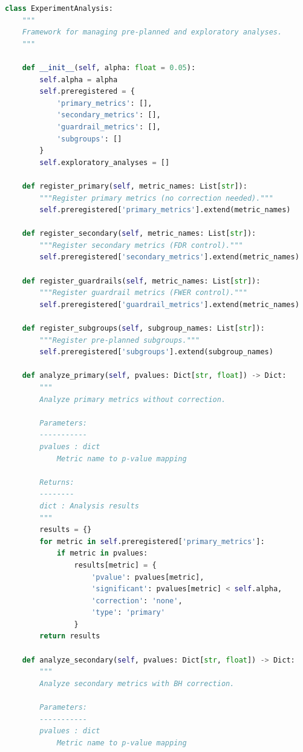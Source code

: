 \begin{lstlisting}[language=Python, caption={Pre-Planned vs Exploratory Framework}]
class ExperimentAnalysis:
    """
    Framework for managing pre-planned and exploratory analyses.
    """

    def __init__(self, alpha: float = 0.05):
        self.alpha = alpha
        self.preregistered = {
            'primary_metrics': [],
            'secondary_metrics': [],
            'guardrail_metrics': [],
            'subgroups': []
        }
        self.exploratory_analyses = []

    def register_primary(self, metric_names: List[str]):
        """Register primary metrics (no correction needed)."""
        self.preregistered['primary_metrics'].extend(metric_names)

    def register_secondary(self, metric_names: List[str]):
        """Register secondary metrics (FDR control)."""
        self.preregistered['secondary_metrics'].extend(metric_names)

    def register_guardrails(self, metric_names: List[str]):
        """Register guardrail metrics (FWER control)."""
        self.preregistered['guardrail_metrics'].extend(metric_names)

    def register_subgroups(self, subgroup_names: List[str]):
        """Register pre-planned subgroups."""
        self.preregistered['subgroups'].extend(subgroup_names)

    def analyze_primary(self, pvalues: Dict[str, float]) -> Dict:
        """
        Analyze primary metrics without correction.

        Parameters:
        -----------
        pvalues : dict
            Metric name to p-value mapping

        Returns:
        --------
        dict : Analysis results
        """
        results = {}
        for metric in self.preregistered['primary_metrics']:
            if metric in pvalues:
                results[metric] = {
                    'pvalue': pvalues[metric],
                    'significant': pvalues[metric] < self.alpha,
                    'correction': 'none',
                    'type': 'primary'
                }
        return results

    def analyze_secondary(self, pvalues: Dict[str, float]) -> Dict:
        """
        Analyze secondary metrics with BH correction.

        Parameters:
        -----------
        pvalues : dict
            Metric name to p-value mapping


\end{lstlisting}
